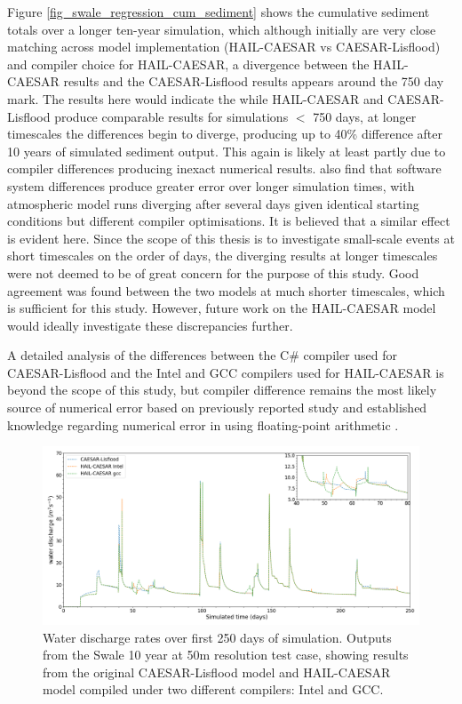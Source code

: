 Figure \ref{fig_swale_regression_cum_sediment} shows the cumulative sediment totals over a longer ten-year simulation, which although initially are very close matching across model implementation (HAIL-CAESAR vs CAESAR-Lisflood) and compiler choice for HAIL-CAESAR, a divergence between the HAIL-CAESAR results and the CAESAR-Lisflood results appears around the 750 day mark. The results here would indicate the while HAIL-CAESAR and CAESAR-Lisflood produce comparable results for simulations $<$ 750 days, at longer timescales the differences begin to diverge, producing up to  40\% difference after 10 years of simulated sediment output. This again is likely at least partly due to compiler differences producing inexact numerical results. \citet{hong2013evaluation} also find that software system differences produce greater error over longer simulation times, with atmospheric model runs diverging after several days given identical starting conditions but different compiler optimisations. It is believed that a similar effect is evident here. 
Since the scope of this thesis is to investigate small-scale events at short timescales on the order of days, the diverging results at longer timescales were not deemed to be of great concern for the purpose of this study. Good agreement was found between the two models at much shorter timescales, which is sufficient for this study. However, future work on the HAIL-CAESAR model would ideally investigate these discrepancies further.

A detailed analysis of the differences between the C\# compiler used for CAESAR-Lisflood and the Intel and GCC compilers used for HAIL-CAESAR is beyond the scope of this study, but compiler difference remains the most likely source of numerical error based on previously reported study \citep{hong2013evaluation} and established knowledge regarding numerical error in using floating-point arithmetic \citep{goldberg1991every,monniaux2008pitfalls}.

\begin{figure}
\includegraphics[width=25cm]{chp05_figures_scripts/lisflood_regerssion_new_colours13.png}
\caption{Water discharge rates over first 250 days of simulation. Outputs from the Swale 10 year at 50m resolution test case, showing results from the original CAESAR-Lisflood model and HAIL-CAESAR model compiled under two different compilers: Intel and GCC.}
\label{fig_swale_regression_lisflood}
\end{figure}

